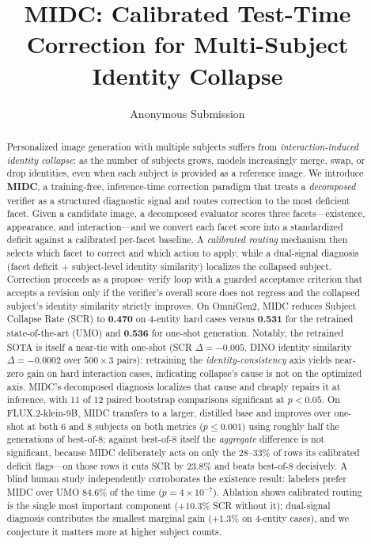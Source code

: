 \documentclass[letterpaper]{article}
\title{MIDC: Calibrated Test-Time Correction for Multi-Subject Identity Collapse}
\author{Anonymous Submission}
\begin{document}
\maketitle

\begin{abstract}
Personalized image generation with multiple subjects suffers from \emph{interaction-induced identity collapse}: as the number of subjects grows, models increasingly merge, swap, or drop identities, even when each subject is provided as a reference image. We introduce \textbf{MIDC}, a training-free, inference-time correction paradigm that treats a \emph{decomposed} verifier as a structured diagnostic signal and routes correction to the most deficient facet. Given a candidate image, a decomposed evaluator scores three facets---existence, appearance, and interaction---and we convert each facet score into a standardized deficit against a calibrated per-facet baseline. A \emph{calibrated routing} mechanism then selects which facet to correct and which action to apply, while a dual-signal diagnosis (facet deficit $+$ subject-level identity similarity) localizes the collapsed subject. Correction proceeds as a propose--verify loop with a guarded acceptance criterion that accepts a revision only if the verifier's overall score does not regress and the collapsed subject's identity similarity strictly improves. On OmniGen2, MIDC reduces Subject Collapse Rate (SCR) to \textbf{0.470} on 4-entity hard cases versus \textbf{0.531} for the retrained state-of-the-art (UMO) and \textbf{0.536} for one-shot generation. Notably, the retrained SOTA is itself a near-tie with one-shot (SCR $\Delta{=}{-}0.005$, DINO identity similarity $\Delta{=}{-}0.0002$ over $500{\times}3$ pairs): retraining the \emph{identity-consistency} axis yields near-zero gain on hard interaction cases, indicating collapse's cause is not on the optimized axis. MIDC's decomposed diagnosis localizes that cause and cheaply repairs it at inference, with 11 of 12 paired bootstrap comparisons significant at $p<0.05$. On FLUX.2-klein-9B, MIDC transfers to a larger, distilled base and improves over one-shot at both 6 and 8 subjects on both metrics ($p\le0.001$) using roughly half the generations of best-of-8; against best-of-8 itself the \emph{aggregate} difference is not significant, because MIDC deliberately acts on only the $28$--$33\%$ of rows its calibrated deficit flags---on those rows it cuts SCR by $23.8\%$ and beats best-of-8 decisively. A blind human study independently corroborates the existence result: labelers prefer MIDC over UMO 84.6\% of the time ($p{=}4{\times}10^{-7}$). Ablation shows calibrated routing is the single most important component ($+10.3\%$ SCR without it); dual-signal diagnosis contributes the smallest marginal gain ($+1.3\%$ on 4-entity cases), and we conjecture it matters more at higher subject counts.
\end{abstract}
\end{document}
